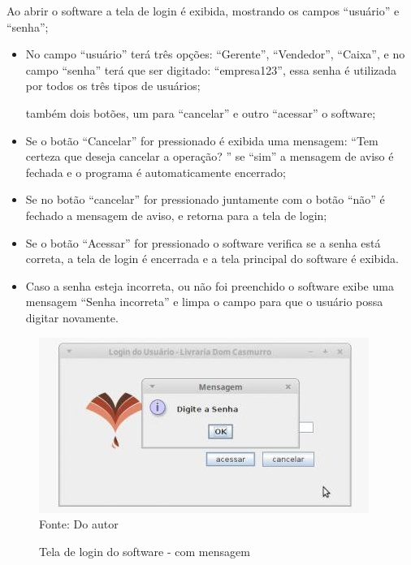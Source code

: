 Ao abrir o software a tela de login é exibida, mostrando os campos “usuário” e “senha”;
 
\begin {itemize} 

\item No campo “usuário” terá três opções: “Gerente”, “Vendedor”, “Caixa”, e no campo “senha” terá que ser digitado: “empresa123”, essa senha é utilizada por todos os três tipos de usuários;

\itemHavendo também  dois botões, um para “cancelar” e outro “acessar” o software;

\item Se o botão “Cancelar” for pressionado é exibida uma mensagem: “Tem certeza que deseja cancelar a operação? ” se “sim” a mensagem de aviso é fechada e o programa é automaticamente encerrado;

\item Se no botão “cancelar” for pressionado juntamente com o botão “não” é fechado a mensagem de aviso, e retorna para a tela de login;

\item Se o botão “Acessar” for pressionado o software verifica se a senha está correta, a tela de login é encerrada e a tela principal do software é exibida. 

\item Caso a senha esteja incorreta, ou não foi preenchido o software exibe uma mensagem “Senha incorreta” e limpa o campo para que o usuário possa digitar novamente.
\end{itemize}


\begin{figure}[H]
	\centering 
	\caption{Tela de login do software - com mensagem}
	\label{login software}
	\includegraphics[scale = 0.8]{imagens/tela-login-senha.jpg}
	\\Fonte: Do autor
\end{figure}


